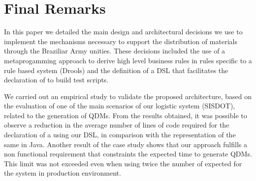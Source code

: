 \section{Final Remarks}
\label{sec:conclusao}


In this paper we detailed the main design and architectural decisions we use to 
implement the mechanisms necessary to support the distribution of materials 
through the Braziliar Army unities. These decisions included the use of 
a metaprogamming approach to derive high level business rules in rules specific to a rule 
based system (Drools) and the definition of a DSL that facilitates the declaration of \callers 
to build test scripts. 


We carried out an empirical study to validate the proposed architecture, based on the evaluation of one of the 
main scenarios of our logistic system (SISDOT), related to the generation of QDMs. From the results obtained, 
it was possible to observe a reduction in the average number of lines of code required for the declaration 
of a \callers using our DSL, in comparison with the representation of the same \shc in Java. 
Another result of the case study shows that our approach fulfills a non functional requirement that constraints 
the expected time to generate QDMs. This limit was not exceeded even when using twice the number of \callers 
expected for the system in production environment.


